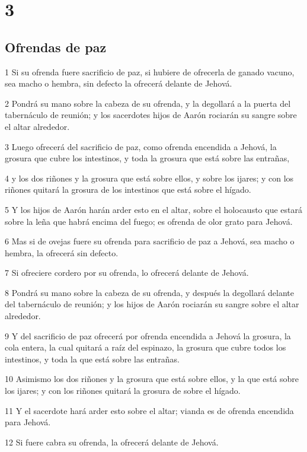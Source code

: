 \chapter{3}

\section*{Ofrendas de paz}

\par 1 Si su ofrenda fuere sacrificio de paz, si hubiere de ofrecerla de ganado vacuno, sea macho o hembra, sin defecto la ofrecerá delante de Jehová.
\par 2 Pondrá su mano sobre la cabeza de su ofrenda, y la degollará a la puerta del tabernáculo de reunión; y los sacerdotes hijos de Aarón rociarán su sangre sobre el altar alrededor.
\par 3 Luego ofrecerá del sacrificio de paz, como ofrenda encendida a Jehová, la grosura que cubre los intestinos, y toda la grosura que está sobre las entrañas,
\par 4 y los dos riñones y la grosura que está sobre ellos, y sobre los ijares; y con los riñones quitará la grosura de los intestinos que está sobre el hígado.
\par 5 Y los hijos de Aarón harán arder esto en el altar, sobre el holocausto que estará sobre la leña que habrá encima del fuego; es ofrenda de olor grato para Jehová.
\par 6 Mas si de ovejas fuere su ofrenda para sacrificio de paz a Jehová, sea macho o hembra, la ofrecerá sin defecto.
\par 7 Si ofreciere cordero por su ofrenda, lo ofrecerá delante de Jehová.
\par 8 Pondrá su mano sobre la cabeza de su ofrenda, y después la degollará delante del tabernáculo de reunión; y los hijos de Aarón rociarán su sangre sobre el altar alrededor.
\par 9 Y del sacrificio de paz ofrecerá por ofrenda encendida a Jehová la grosura, la cola entera, la cual quitará a raíz del espinazo, la grosura que cubre todos los intestinos, y toda la que está sobre las entrañas.
\par 10 Asimismo los dos riñones y la grosura que está sobre ellos, y la que está sobre los ijares; y con los riñones quitará la grosura de sobre el hígado.
\par 11 Y el sacerdote hará arder esto sobre el altar; vianda es de ofrenda encendida para Jehová.
\par 12 Si fuere cabra su ofrenda, la ofrecerá delante de Jehová.
